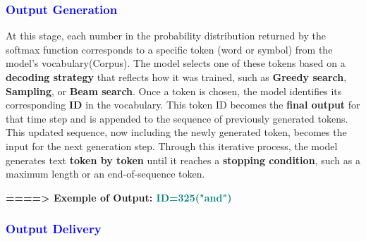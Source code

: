 \documentclass[12pt]{article}
\begin{document}
\textcolor{blue}{\subsubsection{Output Generation}}
At this stage, each number in the probability distribution returned by the softmax function corresponds to a specific token (word or symbol) from the model's vocabulary(Corpus). The model selects one of these tokens based on a \textbf{decoding strategy} that reflects how it was trained, such as \textbf{Greedy search}, \textbf{Sampling}, or \textbf{Beam search}. Once a token is chosen, the model identifies its corresponding \textbf{ID} in the vocabulary. This token ID becomes the \textbf{final output} for that time step and is appended to the sequence of previously generated tokens.\\This updated sequence, now including the newly generated token, becomes the input for the next generation step. Through this iterative process, the model generates text \textbf{token by token} until it reaches a \textbf{stopping condition}, such as a maximum length or an end-of-sequence token.

\textbf{====> Exemple of Output: \textcolor{teal}{\large ID=325("and")}}

\textcolor{blue}{\subsubsection{Output Delivery}}
\end{document}
